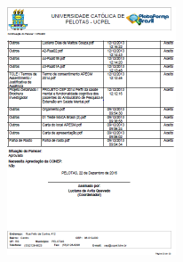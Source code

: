 \documentclass[chapter=TITLE,
               oneside,
               12pt,
               a4paper,
               english,
               brazil]{abntex2}    %
\begin{document}
\begin{anexosenv}
        \begin{center}
        \includegraphics[width=.9\textwidth]{img/cartacep03.pdf}
        \end{center}

\end{anexosenv}
\end{document}
